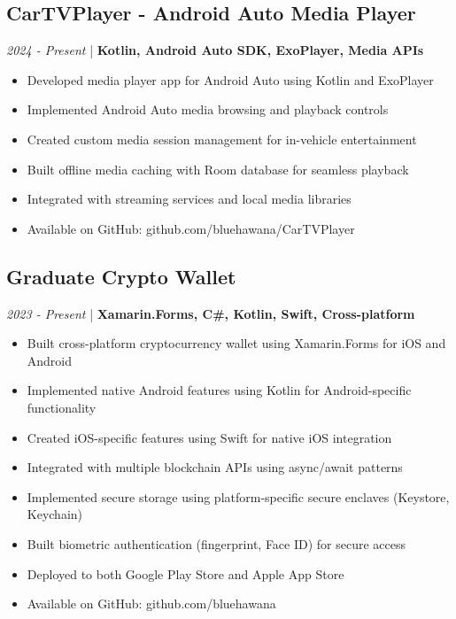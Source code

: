 \documentclass[11pt,a4paper]{article}
\begin{document}
\subsection*{CarTVPlayer - Android Auto Media Player}
\textit{2024 - Present} | \textbf{Kotlin, Android Auto SDK, ExoPlayer, Media APIs}
\begin{itemize}[leftmargin=*, itemsep=1pt]
\item Developed media player app for Android Auto using Kotlin and ExoPlayer
\item Implemented Android Auto media browsing and playback controls
\item Created custom media session management for in-vehicle entertainment
\item Built offline media caching with Room database for seamless playback
\item Integrated with streaming services and local media libraries
\item Available on GitHub: github.com/bluehawana/CarTVPlayer
\end{itemize}

\subsection*{Graduate Crypto Wallet}
\textit{2023 - Present} | \textbf{Xamarin.Forms, C\#, Kotlin, Swift, Cross-platform}
\begin{itemize}[leftmargin=*, itemsep=1pt]
\item Built cross-platform cryptocurrency wallet using Xamarin.Forms for iOS and Android
\item Implemented native Android features using Kotlin for Android-specific functionality
\item Created iOS-specific features using Swift for native iOS integration
\item Integrated with multiple blockchain APIs using async/await patterns
\item Implemented secure storage using platform-specific secure enclaves (Keystore, Keychain)
\item Built biometric authentication (fingerprint, Face ID) for secure access
\item Deployed to both Google Play Store and Apple App Store
\item Available on GitHub: github.com/bluehawana
\end{itemize}
\end{document}
